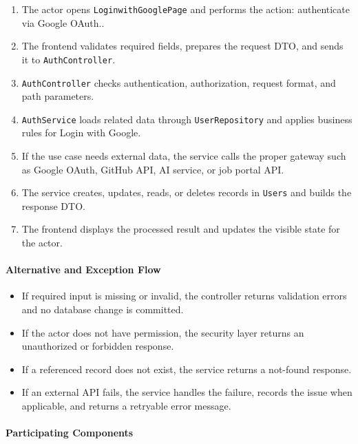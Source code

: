 \begin{enumerate}
    \item The actor opens \texttt{LoginwithGooglePage} and performs the action: authenticate via Google OAuth..
    \item The frontend validates required fields, prepares the request DTO, and sends it to \texttt{AuthController}.
    \item \texttt{AuthController} checks authentication, authorization, request format, and path parameters.
    \item \texttt{AuthService} loads related data through \texttt{UserRepository} and applies business rules for Login with Google.
    \item If the use case needs external data, the service calls the proper gateway such as Google OAuth, GitHub API, AI service, or job portal API.
    \item The service creates, updates, reads, or deletes records in \texttt{Users} and builds the response DTO.
    \item The frontend displays the processed result and updates the visible state for the actor.
\end{enumerate}

\paragraph{Alternative and Exception Flow}

\begin{itemize}
    \item If required input is missing or invalid, the controller returns validation errors and no database change is committed.
    \item If the actor does not have permission, the security layer returns an unauthorized or forbidden response.
    \item If a referenced record does not exist, the service returns a not-found response.
    \item If an external API fails, the service handles the failure, records the issue when applicable, and returns a retryable error message.
\end{itemize}

\paragraph{Participating Components}

